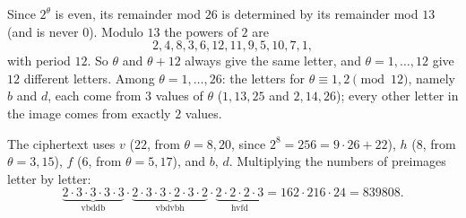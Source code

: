 Since $2^\theta$ is even, its remainder mod $26$ is determined by its remainder mod $13$ (and is never $0$). Modulo $13$ the powers of $2$ are
\[2,4,8,3,6,12,11,9,5,10,7,1,\]
with period $12$. So $\theta$ and $\theta+12$ always give the same letter, and $\theta=1,\dots,12$ give $12$ different letters. Among $\theta=1,\dots,26$: the letters for $\theta\equiv1,2\pmod{12}$, namely $b$ and $d$, each come from $3$ values of $\theta$ ($1,13,25$ and $2,14,26$); every other letter in the image comes from exactly $2$ values.

The ciphertext uses $v$ ($22$, from $\theta=8,20$, since $2^8=256=9\cdot26+22$), $h$ ($8$, from $\theta=3,15$), $f$ ($6$, from $\theta=5,17$), and $b$, $d$. Multiplying the numbers of preimages letter by letter:
\[\underbrace{2\cdot3\cdot3\cdot3\cdot3}_{\text{vbddb}}\cdot\underbrace{2\cdot3\cdot3\cdot2\cdot3\cdot2}_{\text{vbdvbh}}\cdot\underbrace{2\cdot2\cdot2\cdot3}_{\text{hvfd}}=162\cdot216\cdot24=\boxed{839808}.\]

